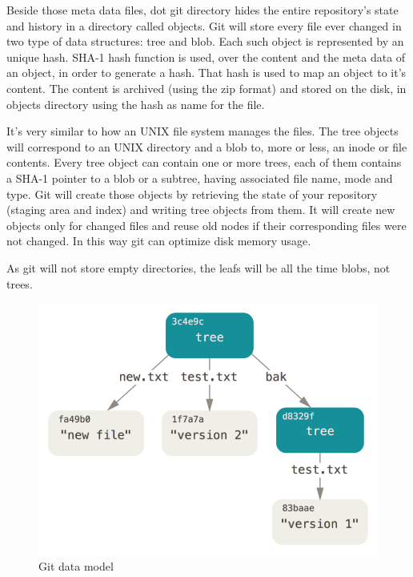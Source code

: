         Beside those meta data files, dot git directory hides the entire repository's state and history in a directory called objects. Git will store every file ever changed in two type of data structures: tree and blob. Each such object is represented by an unique hash. SHA-1 hash function is used, over the content and the meta data of an object, in order to generate a hash. That hash is used to map an object to it's content. The content is archived (using the zip format) and stored on the disk, in objects directory using the hash as name for the file.
        
        It's very similar to how an UNIX file system manages the files. The tree objects will correspond to an UNIX directory and a blob to, more or less, an inode or file contents. Every tree object can contain one or more trees, each of them contains a SHA-1 pointer to a blob or a subtree, having associated file name, mode and type. Git will create those objects by retrieving the state of your repository (staging area and index) and writing tree objects from them. It will create new objects only for changed files and reuse old nodes if their corresponding files were not changed. In this way git can optimize disk memory usage.
        
        As git will not store empty directories, the leafs will be all the time blobs, not trees.
        
        \begin{figure}[h]
           \begin{center}
               \includegraphics[width=15cm]{theoretical/data-model-2.png}
            \end{center}
            \label{fig:git-objects}\caption{Git data model}
        \end{figure}
        
